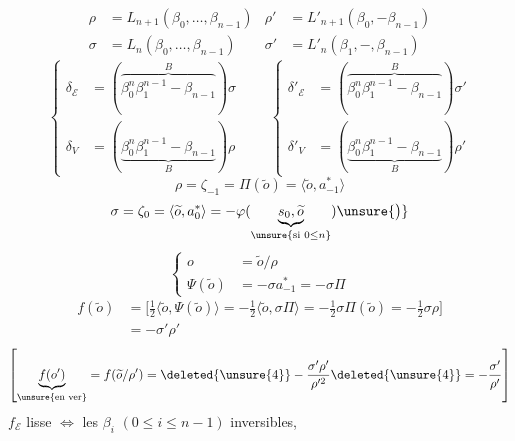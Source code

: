\[
\begin{aligned}
\rho&=L_{n+1}(\beta_0,\ldots,\beta_{n-1})
&\rho'&=L'_{n+1}(\beta_0,\mathbin{-}\beta_{n-1})\\
\sigma&=L_n(\beta_0,\ldots,\beta_{n-1})
&\sigma'&=L'_n(\beta_1,\mathbin{-},\beta_{n-1})
\end{aligned}
\]
\[
\left\{\begin{aligned}
\delta_{\mathcal E}&=(\overbrace{\beta_0^n\beta_1^{n-1}\mathbin{-}\beta_{n-1}}^B)\sigma\\
\delta_V&=(\underbrace{\beta_0^n\beta_1^{n-1}\mathbin{-}\beta_{n-1}}_B)\rho
\end{aligned}\right.
\qquad
\left\{\begin{aligned}
\delta'_{\mathcal E}&=(\overbrace{\beta_0^n\beta_1^{n-1}\mathbin{-}\beta_{n-1}}^B)\sigma'\\
\delta'_V&=(\underbrace{\beta_0^n\beta_1^{n-1}\mathbin{-}\beta_{n-1}}_B)\rho'
\end{aligned}\right.
\]
\margin{\[
\widetilde o=\rho a_{-1}+\sigma a_0+\zeta_1a_1\mathbin{-}+\zeta_na_n
\qquad(\zeta_n=1,\zeta_{n-1}=2\ldots)
\]}
\[
\rho=\zeta_{-1}=\Pi(\widetilde o)=\langle\widetilde o,a_{-1}^*\rangle
\]
\[
\sigma=\zeta_0=\langle\widetilde o,a_0^*\rangle
=-\varphi(\underbrace{s_0,\widetilde o}_{\unsure{\text{si }0\leq n}})\unsure{\big)}
\]
\[
\left\{\begin{aligned}
o&=\widetilde o/\rho\\
\Psi(\widetilde o)&=-\sigma a_{-1}^*=-\sigma\Pi
\end{aligned}\right.
\]
\margin{\[
o'=2o=
\left\{\begin{aligned}
&\deleted{\unsure{2}}\widetilde o/\rho'&&n\text{ pair}\\
&\deleted{\unsure{\widetilde o/\rho'}}
2\widetilde o/\rho&&n\text{ impair}\\
&\text{''}\quad2\widetilde o/\rho'
\end{aligned}\right.
\]}
\[
\begin{aligned}
f(\widetilde o)
&=\bigl[\tfrac12\langle\widetilde o,\Psi(\widetilde o)\rangle
=-\tfrac12\langle\widetilde o,\sigma\Pi\rangle
=-\tfrac12\sigma\Pi(\widetilde o)
=-\tfrac12\sigma\rho\bigr]\\
&=-\sigma'\rho'
\end{aligned}
\]
\[
\left[
\underbrace{f(o')}_{\unsure{\text{en ver}}}
=f(\widetilde o/\rho')
=\deleted{\unsure{4}}-\frac{\sigma'\rho'}{\rho'^2}
\deleted{\unsure{4}}
=-\frac{\sigma'}{\rho'}
\right]
\]
$f_{\mathcal E}$ lisse
$\Longleftrightarrow$ les $\beta_i$ $(0\leq i\leq n-1)$ inversibles,
